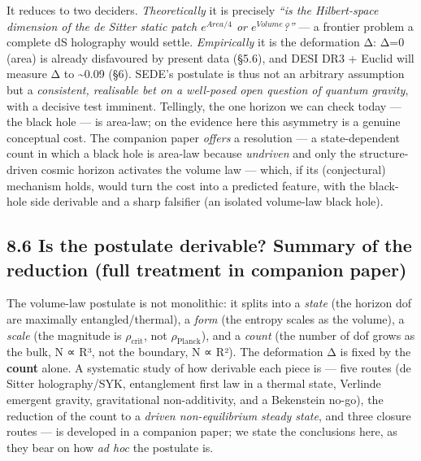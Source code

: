 \documentclass[
  10pt,
]{article}
\begin{document}
It reduces to two deciders. \emph{Theoretically} it is precisely
\emph{``is the Hilbert-space dimension of the de Sitter static patch
\(e^{Area/4}\) or \(e^{Volume}\)?''} --- a frontier problem a complete
dS holography would settle. \emph{Empirically} it is the deformation Δ:
Δ=0 (area) is already disfavoured by present data (§5.6), and DESI DR3 +
Euclid will measure Δ to \textasciitilde0.09 (§6). SEDE's postulate is
thus not an arbitrary assumption but a \emph{consistent, realisable bet
on a well-posed open question of quantum gravity}, with a decisive test
imminent. Tellingly, the one horizon we can check today --- the black
hole --- is area-law; on the evidence here this asymmetry is a genuine
conceptual cost. The companion paper \emph{offers} a resolution --- a
state-dependent count in which a black hole is area-law because
\emph{undriven} and only the structure-driven cosmic horizon activates
the volume law --- which, if its (conjectural) mechanism holds, would
turn the cost into a predicted feature, with the black-hole side
derivable and a sharp falsifier (an isolated volume-law black hole).

\subsection{8.6 Is the postulate derivable? Summary of the reduction
(full treatment in companion
paper)}\label{is-the-postulate-derivable-summary-of-the-reduction-full-treatment-in-companion-paper}

The volume-law postulate is not monolithic: it splits into a
\emph{state} (the horizon dof are maximally entangled/thermal), a
\emph{form} (the entropy scales as the volume), a \emph{scale} (the
magnitude is \(\rho _{\mathrm{crit}}\), not
\(\rho _{\mathrm{Planck}}\)), and a \emph{count} (the number of dof
grows as the bulk, N ∝ R³, not the boundary, N ∝ R²). The deformation Δ
is fixed by the \textbf{count} alone. A systematic study of how
derivable each piece is --- five routes (de Sitter holography/SYK,
entanglement first law in a thermal state, Verlinde emergent gravity,
gravitational non-additivity, and a Bekenstein no-go), the reduction of
the count to a \emph{driven non-equilibrium steady state}, and three
closure routes --- is developed in a companion paper; we state the
conclusions here, as they bear on how \emph{ad hoc} the postulate is.
\end{document}
